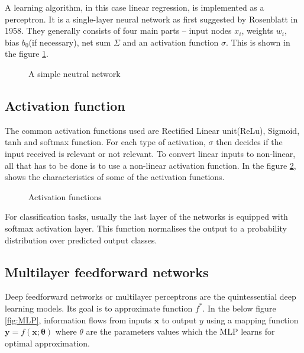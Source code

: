 A learning algorithm, in this case linear regression, is implemented as a perceptron. It
is a single-layer neural network as first suggested by Rosenblatt in 1958. They generally consists of four main parts -- input
nodes $x_i$, weights $w_i$, bias $b_0$(if necessary), net sum $\Sigma$ and an activation
function $\sigma$. This is shown in the figure \ref{fig:simpleNN}.

\begin{figure}[h]
    \centering
        \def\svgwidth{0.5\textwidth}
        
        \caption{A simple neutral network}
        \label{fig:simpleNN}
\end{figure}

\subsection{Activation function}
\label{subsec:activationfunction}
The common activation functions used are Rectified Linear unit(ReLu), Sigmoid, tanh and
softmax function. For each type of activation, $\sigma$ then decides if the input received is
relevant or not relevant. To convert linear inputs to non-linear, all that has to be done
is to use a non-linear activation function. In the figure \ref{fig:activationfunctions},
shows the characteristics of some of the activation functions.
\begin{figure}[ht]
	\begin{center}
   \def\svgwidth{0.5\textwidth}
	\end{center}
    \caption{Activation functions}
    \label{fig:activationfunctions}
\end{figure}
For classification tasks, usually the last layer of the networks is equipped with softmax
activation layer. This function normalises the output to a probability distribution over
predicted output classes.

\subsection{Multilayer feedforward networks}
\label{subsec:MLP}
Deep feedforward networks or multilayer perceptrons are the quintessential deep learning
models. Its goal is to approximate function $f^*$. In the below figure \ref{fig:MLP},
information flows from inputs $\mathbf{x}$ to output $y$ using a mapping function
$\mathbf{y} = f(\mathbf{x};\mathbf{\theta})$ where $\theta$ are the parameters values
which the MLP learns for optimal approximation.

